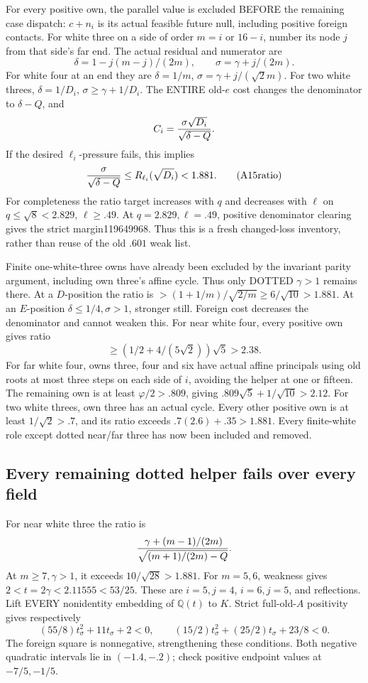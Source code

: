 \documentclass[11pt]{article}
\begin{document}
For every positive own, the parallel value is excluded BEFORE
the remaining case dispatch: \(c+n_i\) is its actual feasible
future null, including positive foreign contacts.
For white three on a side of order \(m=i\) or \(16-i\),
number its node \(j\) from that side's far end.
The actual residual and numerator are
\[
 \delta=1-j(m-j)/(2m),\qquad \sigma=\gamma+j/(2m).
\]
For white four at an end they are
\(\delta=1/m\), \(\sigma=\gamma+j/(\sqrt2m)\).
For two white threes, \(\delta=1/D_i\),
\(\sigma\ge\gamma+1/D_i\).
The ENTIRE old-\(e\) cost changes the denominator to
\(\delta-Q\), and
\[
                   C_i={\sigma\sqrt{D_i}\over\sqrt{\delta-Q}} .
\]
If the desired \(\ell_i\)-pressure fails, this implies
\[
 {\sigma\over\sqrt{\delta-Q}}
       \le R_{\ell_i}(\sqrt{D_i})<1.881 .
\tag{A15ratio}\label{eq:arithA15ratio}
\]
For completeness the ratio target increases with \(q\) and
decreases with \(\ell\) on \(q\le\sqrt8<2.829\),
\(\ell\ge.49\).
At \(q=2.829,\ell=.49\), positive denominator clearing gives
the strict margin119649968.
Thus this is a fresh changed-loss inventory, rather than
reuse of the old \(.601\) weak list.

Finite one-white-three owns have already been excluded by
the invariant parity argument, including own three's affine cycle.
Thus only DOTTED \(\gamma>1\) remains there.
At a \(D\)-position the ratio is
\(>(1+1/m)/\sqrt{2/m}\ge6/\sqrt{10}>1.881\).
At an \(E\)-position \(\delta\le1/4,\sigma>1\), stronger still.
Foreign cost decreases the denominator and cannot weaken this.
For near white four, every positive own gives ratio
\[
            \ge(1/2+4/(5\sqrt2))\sqrt5>2.38 .
\]
For far white four, owns three, four and six have actual
affine principals using old roots at most three steps on each
side of \(i\), avoiding the helper at one or fifteen.
The remaining own is at least \(\varphi/2>.809\), giving
\(.809\sqrt5+1/\sqrt{10}>2.12\).
For two white threes, own three has an actual cycle.
Every other positive own is at least \(1/\sqrt2>.7\),
and its ratio exceeds \(.7(2.6)+.35>1.881\).
Every finite-white role except dotted near/far three has now
been included and removed.

\subsection{Every remaining dotted helper fails over every field}
\label{app:arithA15dottedhelpers}

For near white three the ratio is
\[
 {\,\gamma+(m-1)/(2m)\over\sqrt{(m+1)/(2m)-Q}}.
\]
At \(m\ge7,\gamma>1\), it exceeds \(10/\sqrt{28}>1.881\).
For \(m=5,6\), weakness gives
\(2<t=2\gamma<2.11555<53/25\).
These are \(i=5,j=4\), \(i=6,j=5\), and reflections.
Lift EVERY nonidentity embedding of \(\mathbb Q(t)\) to \(K\).
Strict full-old-\(A\) positivity gives respectively
\[
 (55/8)t_\sigma^2+11t_\sigma+2<0,\qquad
 (15/2)t_\sigma^2+(25/2)t_\sigma+23/8<0 .
\]
The foreign square is nonnegative, strengthening these conditions.
Both negative quadratic intervals lie in \((-1.4,-.2)\);
check positive endpoint values at \(-7/5,-1/5\).
\end{document}
